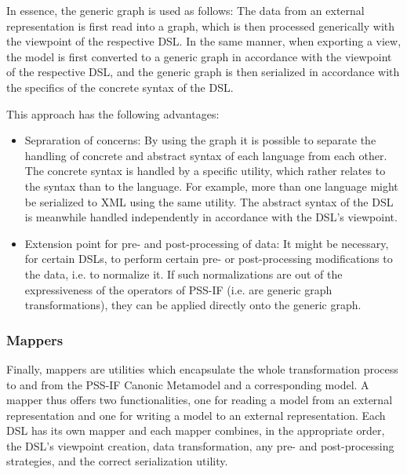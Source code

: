 In essence, the generic graph is used as follows: The data from an external representation is first read into a graph, which is then processed generically with the viewpoint of the respective DSL. In the same manner, when exporting a view, the model is first converted to a generic graph in accordance with the viewpoint of the respective DSL, and the generic graph is then serialized in accordance with the specifics of the concrete syntax of the DSL.

This approach has the following advantages:

\begin{itemize}
\item Sepraration of concerns: By using the graph it is possible to separate the handling of concrete and abstract syntax of each language from each other. The concrete syntax is handled by a specific utility, which rather relates to the syntax than to the language. For example, more than one language might be serialized to XML using the same utility. The abstract syntax of the DSL is meanwhile handled independently in accordance with the DSL's viewpoint.
\item Extension point for pre- and post-processing of data: It might be necessary, for certain DSLs, to perform certain pre- or post-processing modifications to the data, i.e. to normalize it. If such normalizations are out of the expressiveness of the operators of PSS-IF (i.e. are generic graph transformations), they can be applied directly onto the generic graph.
\end{itemize}

\subsubsection{Mappers}

Finally, mappers are utilities which encapsulate the whole transformation process to and from the PSS-IF Canonic Metamodel and a corresponding model. A mapper thus offers two functionalities, one for reading a model from an external representation and one for writing a model to an external representation. Each DSL has its own mapper and each mapper combines, in the appropriate order, the DSL's viewpoint creation, data transformation, any pre- and post-processing strategies, and the correct serialization utility.